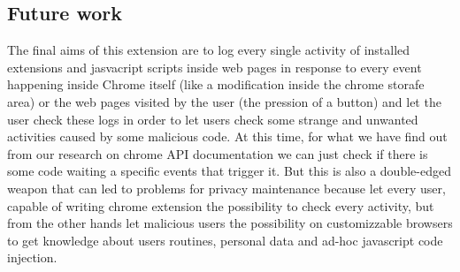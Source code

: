 \documentclass[12pt]{article}
\begin{document}
\begin{multicols}{2}
\subsection{Future work}
	The final aims of this extension are to log every single activity of installed extensions and jasvacript scripts inside web pages in response to every event happening inside Chrome itself (like a modification inside the chrome storafe area) or the web pages visited by the user (the pression of a button) and let the user check these logs	in order to let users check some strange and unwanted activities caused by some malicious code. At this time, for what we have find out from our research on chrome API documentation we can just check if there is some code waiting a specific events that trigger it.
	But this is also a double-edged weapon that can led to problems for privacy maintenance because let every user, capable of writing chrome extension the possibility to check every activity, but from the other hands let malicious users the possibility  on customizzable browsers to get knowledge about users routines, personal data and ad-hoc javascript code injection.
\end{multicols}
 
\end{document}
